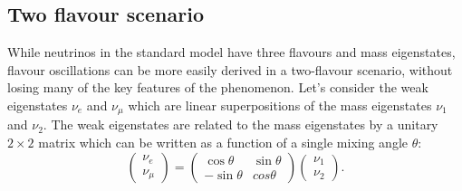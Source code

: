 \subsection{Two flavour scenario}
\label{Sec:2flavour}
While neutrinos in the standard model have three flavours and mass eigenstates, flavour oscillations can be more easily derived in a two-flavour scenario, without losing many of the key features of the phenomenon. Let's consider the weak eigenstates $\nu_e$ and $\nu_\mu$ which are linear superpositions of the mass eigenstates $\nu_1$ and $\nu_2$. The weak eigenstates are related to the mass eigenstates by a unitary $2\times 2$ matrix which can be written as a function of a single mixing angle $\theta$:
\begin{equation}
    \begin{pmatrix}
        \nu_e \\ \nu_\mu
    \end{pmatrix}
    =
    \begin{pmatrix}
        \cos \theta & \sin \theta \\
        -\sin\theta & cos \theta
    \end{pmatrix}
    \begin{pmatrix}
        \nu_1 \\ \nu_2
    \end{pmatrix} .
\end{equation}

